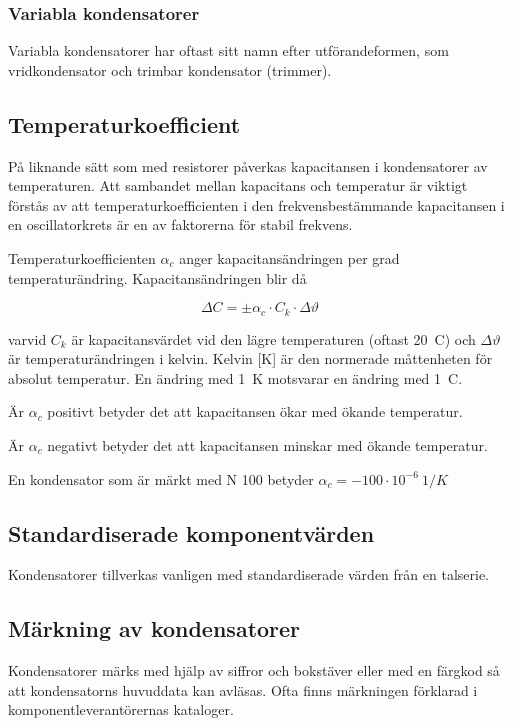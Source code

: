 \subsubsection{Variabla kondensatorer}
Variabla kondensatorer har oftast sitt namn efter utförandeformen, som
vridkondensator och trimbar kondensator (trimmer).

\subsection{Temperaturkoefficient}

På liknande sätt som med resistorer påverkas kapacitansen i kondensatorer av
temperaturen. Att sambandet mellan kapacitans och temperatur är viktigt förstås
av att temperaturkoefficienten i den frekvensbestämmande kapacitansen i en
oscillatorkrets är en av faktorerna för stabil frekvens.

Temperaturkoefficienten \(\alpha _c\) anger kapacitansändringen per grad temperaturändring.
Kapacitansändringen blir då

\[\Delta C = \pm \alpha _c \cdot C_k \cdot \Delta\vartheta\]

varvid \(C_k\) är kapacitansvärdet vid den lägre temperaturen (oftast 20~\degree C) och
\(\Delta\vartheta\) är temperaturändringen i kelvin.
Kelvin [K] är den normerade måttenheten för absolut temperatur.
En ändring med 1~K motsvarar en ändring med 1~\degree C.

Är \(\alpha _c\) positivt betyder det att kapacitansen ökar med ökande
temperatur.

Är \(\alpha _c\) negativt betyder det att kapacitansen minskar med ökande
temperatur.

En kondensator som är märkt med N 100 betyder
\(\alpha _c = -100 \cdot 10^{-6}\ 1/K\)

\subsection{Standardiserade komponentvärden}

Kondensatorer tillverkas vanligen med standardiserade värden från en talserie.

\subsection{Märkning av kondensatorer}

Kondensatorer märks med hjälp av siffror och bokstäver eller med en färgkod så att
kondensatorns huvuddata kan avläsas. Ofta finns märkningen förklarad i 
komponentleverantörernas kataloger.

